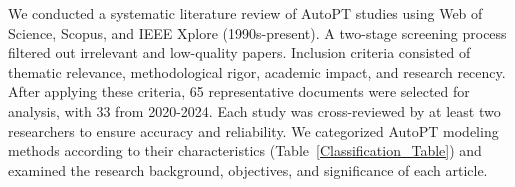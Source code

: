 





We conducted a systematic literature review of AutoPT studies using Web of Science, Scopus, and IEEE Xplore (1990s-present). A two-stage screening process filtered out irrelevant and low-quality papers. Inclusion criteria consisted of thematic relevance, methodological rigor, academic impact, and research recency.
After applying these criteria, 65 representative documents were selected for analysis, with 33 from 2020-2024. Each study was cross-reviewed by at least two researchers to ensure accuracy and reliability. We categorized AutoPT modeling methods according to their characteristics (Table~\ref{Classification_Table}) and examined the research background, objectives, and significance of each article.


